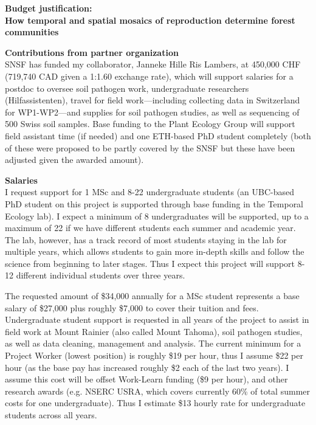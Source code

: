 \documentclass[12pt,oneside]{article}
\begin{document}
% 
\renewcommand{\labelitemi}{$\textendash$}
\begin{center}
{\bf Budget justification: \\How temporal and spatial mosaics of reproduction determine forest communities}
\vspace{-0.5ex}
\end{center}
{\bf Contributions from partner organization}\\
SNSF has funded my collaborator, Janneke Hille Ris Lambers, at 450,000 CHF (719,740 CAD given a 1:1.60 exchange rate), which will support salaries for a postdoc to oversee soil pathogen work, undergraduate researchers (Hilfassistenten), travel for field work---including collecting data in Switzerland for WP1-WP2---and supplies for soil pathogen studies, as well as sequencing of 500 Swiss soil samples. Base funding to the Plant Ecology Group will support field assistant time (if needed) and one ETH-based PhD student completely (both of these were proposed to be partly covered by the SNSF but these have been adjusted given the awarded amount). 

{\bf Salaries}\\
I request support for 1 MSc and 8-22 undergraduate students (an UBC-based PhD student on this project is supported through base funding in the Temporal Ecology lab). I expect a minimum of 8  undergraduates will be supported, up to a maximum of 22 if we have different students each summer and academic year. The lab, however, has a track record of most students staying in the lab for multiple years, which allows students to gain more in-depth skills and follow the science from beginning to later stages. Thus I expect this project will support  8-12 different individual students over three years. 

The requested amount of \$34,000 annually for a MSc student represents a base salary of \$27,000 plus roughly \$7,000 to cover their tuition and fees. Undergraduate student support is requested in all years of the project to assist in field work at Mount Rainier (also called Mount Tahoma), soil pathogen studies, as well as data cleaning, management and analysis. The current minimum for a Project Worker (lowest position) is roughly \$19 per hour, thus I assume \$22 per hour (as the base pay has increased roughly \$2 each of the last two years). I assume this cost will be offset Work-Learn funding (\$9 per hour), and other research awards (e.g. NSERC USRA, which covers currently 60\% of total summer costs for one undergraduate). Thus I estimate \$13 hourly rate for undergraduate students across all years. 
\end{document}
